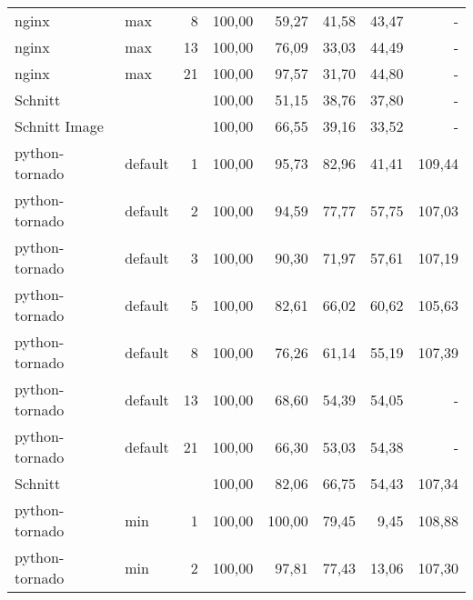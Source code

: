 \begin{footnotesize}
\begin{longtable}{llrrrrrr}
		nginx          & max     & 8          & 100,00 & 59,27                       & 41,58                          & 43,47  & -      \\
		nginx          & max     & 13         & 100,00 & 76,09                       & 33,03                          & 44,49  & -      \\
		nginx          & max     & 21         & 100,00 & 97,57                       & 31,70                          & 44,80  & -      \\ \hline
		Schnitt        &         &            & 100,00 & 51,15                       & 38,76                          & 37,80  & -      \\ \hline
		\multicolumn{2}{l}{Schnitt Image} &            & 100,00 & 66,55                       & 39,16                          & 33,52  & -      \\ \hline
		{\scriptsize python-tornado} & default & 1          & 100,00 & 95,73                       & 82,96                          & 41,41  & 109,44 \\
		{\scriptsize python-tornado} & default & 2          & 100,00 & 94,59                       & 77,77                          & 57,75  & 107,03 \\
		{\scriptsize python-tornado} & default & 3          & 100,00 & 90,30                       & 71,97                          & 57,61  & 107,19 \\
		{\scriptsize python-tornado} & default & 5          & 100,00 & 82,61                       & 66,02                          & 60,62  & 105,63 \\
		{\scriptsize python-tornado} & default & 8          & 100,00 & 76,26                       & 61,14                          & 55,19  & 107,39 \\
		{\scriptsize python-tornado} & default & 13         & 100,00 & 68,60                       & 54,39                          & 54,05  & -      \\
		{\scriptsize python-tornado} & default & 21         & 100,00 & 66,30                       & 53,03                          & 54,38  & -      \\ \hline
		Schnitt        &         &            & 100,00 & 82,06                       & 66,75                          & 54,43  & 107,34 \\ \hline
		{\scriptsize python-tornado} & min     & 1          & 100,00 & \cellcolor[HTML]{C0C0C0}100,00 & 79,45                          & 9,45   & 108,88 \\
		{\scriptsize python-tornado} & min     & 2          & 100,00 & 97,81                       & 77,43                          & 13,06  & 107,30 \\

\end{longtable}
\end{footnotesize}
